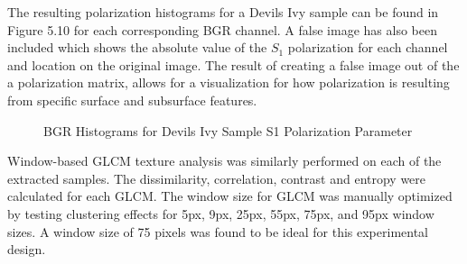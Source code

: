 %
The resulting polarization histograms for a Devils Ivy sample can be found in Figure 5.10 for each corresponding BGR channel.  A false image has also been included which shows the absolute value of the $S_1$ polarization for each channel and location on the original image.  The result of creating a false image out of the a polarization matrix, allows for a visualization for how polarization is resulting from specific surface and subsurface features.
\begin{figure}
    \begin{center}
    \end{center}
    \caption{BGR Histograms for Devils Ivy Sample S1 Polarization Parameter}
    \label{fig:polarization}
\end{figure}
Window-based GLCM texture analysis was similarly performed on each of the extracted samples.  The dissimilarity, correlation, contrast and entropy were calculated for each GLCM.  The window size for GLCM was manually optimized by testing clustering effects for 5px, 9px, 25px, 55px, 75px, and 95px window sizes.  A window size of 75 pixels was found to be ideal for this experimental design.


